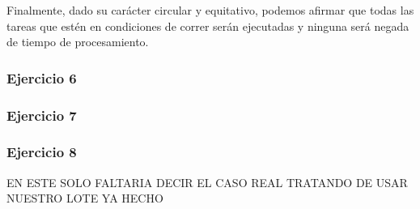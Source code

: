 \indent Finalmente, dado su carácter circular y equitativo, podemos afirmar que todas las tareas que 
estén en condiciones de correr serán ejecutadas y ninguna será negada de tiempo de procesamiento.\\


\subsubsection[Resolución Ejercicio 5]{Ejercicio 6}

\subsubsection[Resolución Ejercicio 5]{Ejercicio 7}

\subsubsection[Resolución Ejercicio 8]{Ejercicio 8}

EN ESTE SOLO FALTARIA DECIR EL CASO REAL TRATANDO DE USAR NUESTRO LOTE YA HECHO

